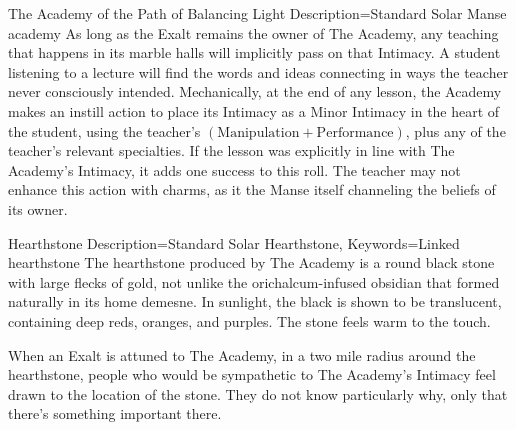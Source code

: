\begin{Merit}{The Academy of the Path of Balancing Light}{
    Description=Standard Solar Manse
}{academy}
As long as the Exalt remains the owner of The Academy, any teaching that
happens in its marble halls will implicitly pass on that Intimacy. A student
listening to a lecture will find the words and ideas connecting in ways the
teacher never consciously intended. Mechanically, at the end of any lesson, the
Academy makes an instill action to place its Intimacy as a Minor Intimacy in
the heart of the student, using the teacher's $(\mathrm{Manipulation} +
\mathrm{Performance})$, plus any of the teacher's relevant specialties. If the
lesson was explicitly in line with The Academy's Intimacy, it adds one success
to this roll. The teacher may not enhance this action with charms, as it the
Manse itself channeling the beliefs of its owner.
\end{Merit}

\begin{Merit}{Hearthstone}{
    Description=Standard Solar Hearthstone,
    Keywords=Linked
}{hearthstone}
The hearthstone produced by The Academy is a round black stone with large
flecks of gold, not unlike the orichalcum-infused obsidian that formed
naturally in its home demesne. In sunlight, the black is shown to be
translucent, containing deep reds, oranges, and purples. The stone feels warm
to the touch.

When an Exalt is attuned to The Academy, in a two mile radius around the
hearthstone, people who would be sympathetic to The Academy's Intimacy feel
drawn to the location of the stone. They do not know particularly why, only
that there's something important there.
\end{Merit}

\printbibliography[title=References]


